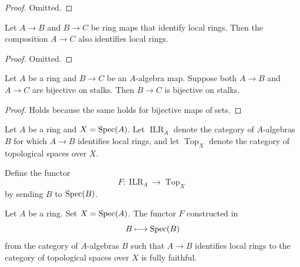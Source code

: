 \begin{proof}
  \leanok
  Omitted.
\end{proof}

\begin{lemma}
  \label{thm:identifies-local-rings-composition}
  Let \(A \to B\) and \(B \to C\) be ring maps that identify local rings. Then the composition \(A \to C\) also identifies local rings.
  \leanok
\end{lemma}

\begin{proof}
  \leanok
  Omitted.
\end{proof}

\begin{lemma}[\stacksproject{096D}]
    Let $A$ be a ring and $B \to C$ be an $A$-algebra map. Suppose both
    $A \to B$ and $A \to C$ are bijective on stalks. Then $B \to C$ is bijective on stalks.
    \label{lemma:bijective-on-stalks-of-comp}
    \leanok
\end{lemma}

\begin{proof}
    \leanok
    Holds because the same holds for bijective maps of sets.
\end{proof}

\begin{definition}
  \label{def:identifies-local-ring-to-top}
  Let $A$ be a ring and $X = \operatorname{Spec}(A)$. Let $\operatorname{ILR}_A$ denote the category of $A$-algebras $B$ for which $A \to B$ identifies local rings, and let $\operatorname{Top}_X$ denote the category of topological spaces over $X$.
  
  Define the functor
  \[
  F \colon \operatorname{ILR}_A \longrightarrow \operatorname{Top}_X
  \]
  by sending $B$ to $\operatorname{Spec}(B)$.
\end{definition}

\begin{lemma}{\cite[\href{https://stacks.math.columbia.edu/tag/096L}{Tag 096L}]{stacks-project}}
  \label{thm:identifies-local-ring-to-top-fully-faithful}
  Let $A$ be a ring. Set $X = \operatorname{Spec} (A)$. The functor \(F\) constructed in 
  \[
  B \longmapsto \operatorname{Spec} (B)
  \]
  from the category of $A$-algebras $B$ such that $A \to B$ identifies local rings to the category of topological spaces over $X$ is fully faithful.
\end{lemma}

